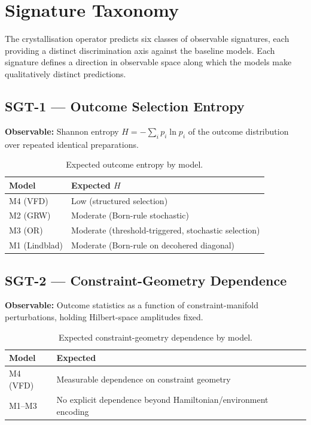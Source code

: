 \documentclass[12pt]{article}
\begin{document}
\section{Signature Taxonomy}
\label{sec:signatures}

The crystallisation operator predicts six classes of observable signatures, each providing a distinct discrimination axis against the baseline models. Each signature defines a direction in observable space along which the models make qualitatively distinct predictions.

\subsection{SGT-1 --- Outcome Selection Entropy}

\textbf{Observable:} Shannon entropy $H = -\sum_i p_i \ln p_i$ of the outcome distribution over repeated identical preparations.

\begin{table}[ht]
\centering
\caption{Expected outcome entropy by model.}
\begin{tabular}{@{}ll@{}}
\toprule
Model & Expected $H$ \\
\midrule
M4 (VFD) & Low (structured selection) \\
M2 (GRW) & Moderate (Born-rule stochastic) \\
M3 (OR) & Moderate (threshold-triggered, stochastic selection) \\
M1 (Lindblad) & Moderate (Born-rule on decohered diagonal) \\
\bottomrule
\end{tabular}
\end{table}

\subsection{SGT-2 --- Constraint-Geometry Dependence}

\textbf{Observable:} Outcome statistics as a function of constraint-manifold perturbations, holding Hilbert-space amplitudes fixed.

\begin{table}[ht]
\centering
\caption{Expected constraint-geometry dependence by model.}
\begin{tabular}{@{}ll@{}}
\toprule
Model & Expected \\
\midrule
M4 (VFD) & Measurable dependence on constraint geometry \\
M1--M3 & No explicit dependence beyond Hamiltonian/environment encoding \\
\bottomrule
\end{tabular}
\end{table}
\end{document}
